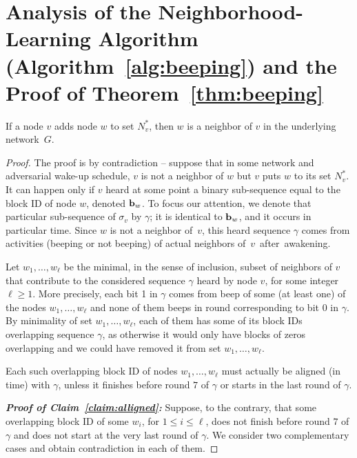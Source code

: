 \documentclass[11pt]{article}
\begin{document}
\section{Analysis of the Neighborhood-Learning Algorithm (Algorithm~\ref{alg:beeping}) and the Proof of Theorem~\ref{thm:beeping}}\label{app:neigh}


\begin{lemma}[Safety]
\label{lem:beeping-reliability}
If a node $v$ adds node $w$ to set $N^*_v$, then $w$ is a neighbor of $v$ in the underlying network~$G$.
\end{lemma}

\begin{proof}
The proof is by contradiction -- suppose that in some network and adversarial wake-up schedule, $v$ is not a neighbor of $w$ but $v$ puts $w$ to its set $N^*_v$. It can happen only if $v$ heard at some point a binary sub-sequence equal to the block ID of node $w$, denoted ${\mathbf b}_w$.
To focus our attention, we denote that particular sub-sequence of $\sigma_v$ by $\gamma$; it is identical to ${\mathbf b}_w$, and it occurs in particular time. 
Since $w$ is not a neighbor of~$v$, this heard sequence $\gamma$ comes from activities (beeping or not beeping) of actual neighbors of~$v$~after~awakening.

Let $w_1,\ldots,w_\ell$ be the minimal, in the sense of inclusion, subset of neighbors of $v$ that contribute to the considered sequence $\gamma$
heard by node $v$, for some integer $\ell\ge 1$. More precisely, each bit 1 in $\gamma$ comes from beep of some (at least one) of the nodes $w_1,\ldots,w_\ell$ and none of them beeps in round corresponding to bit 0 in $\gamma$. 
By minimality of set $w_1,\ldots,w_\ell$, each of them has some of its block IDs overlapping sequence $\gamma$, as otherwise it would only have blocks of zeros overlapping and we could have removed it from set $w_1,\ldots,w_\ell$.


\begin{claim}
\label{claim:alligned}
Each such overlapping block ID of nodes $w_1,\ldots,w_\ell$ must actually be aligned (in time) with $\gamma$, unless it finishes before round $7$ of $\gamma$ or starts in the last round of $\gamma$.     
\end{claim}

\noindent
{\bf\em Proof of Claim~\ref{claim:alligned}:}
Suppose, to the contrary, that some overlapping block ID of some $w_i$, for $1\le i\le \ell$, 
does not finish before round $7$ of $\gamma$ and does not start at the very last round of $\gamma$. 
We consider two complementary cases and obtain contradiction in each of them.


\end{proof}
\end{document}
